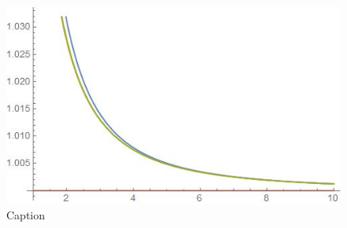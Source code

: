 \begin{figure}
    \centering
    \includegraphics{images/a o DivFactor comparados.jpg}
    \caption{Caption}
    \label{fig:acomparados}
\end{figure}

